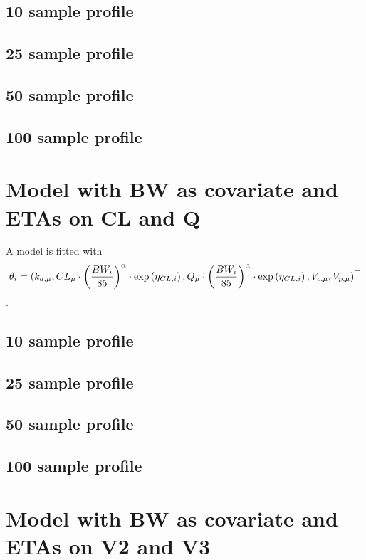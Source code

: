\subsection{10 sample profile}

\subsection{25 sample profile}

\subsection{50 sample profile}

\subsection{100 sample profile}


\section{Model with BW as covariate and ETAs on CL and Q}
A model is fitted with $$\theta_i = (k_{a,\mu}, CL_{\mu}\cdot \left(\frac{BW_i}{85}\right)^\alpha \cdot \text{exp}\left({\eta_{CL,i}}\right), Q_{\mu}\cdot \left(\frac{BW_i}{85}\right)^\alpha \cdot\text{exp}\left({\eta_{CL,i}}\right),V_{c,\mu},V_{p,\mu})^\top$$.
\subsection{10 sample profile}

\subsection{25 sample profile}

\subsection{50 sample profile}

\subsection{100 sample profile}


\section{Model with BW as covariate and ETAs on V2 and V3}
